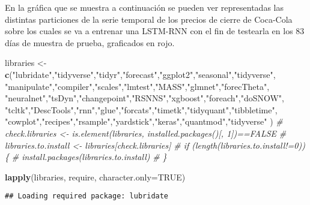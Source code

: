 \documentclass[]{article}
\newenvironment{Shaded}{\begin{snugshade}}{\end{snugshade}}
\newcommand{\CommentTok}[1]{\textcolor[rgb]{0.56,0.35,0.01}{\textit{#1}}}
\newcommand{\DataTypeTok}[1]{\textcolor[rgb]{0.13,0.29,0.53}{#1}}
\newcommand{\KeywordTok}[1]{\textcolor[rgb]{0.13,0.29,0.53}{\textbf{#1}}}
\newcommand{\NormalTok}[1]{#1}
\newcommand{\OtherTok}[1]{\textcolor[rgb]{0.56,0.35,0.01}{#1}}
\newcommand{\StringTok}[1]{\textcolor[rgb]{0.31,0.60,0.02}{#1}}
\begin{document}
\justifying

En la gráfica que se muestra a continuación se pueden ver representadas
las distintas particiones de la serie temporal de los precios de cierre
de Coca-Cola sobre los cuales se va a entrenar una LSTM-RNN con el fin
de testearla en los 83 días de muestra de prueba, graficados en rojo.

\centering

\begin{Shaded}
\begin{Highlighting}[]
\NormalTok{libraries <-}\StringTok{ }\KeywordTok{c}\NormalTok{(}\StringTok{"lubridate"}\NormalTok{,}\StringTok{"tidyverse"}\NormalTok{,}\StringTok{"tidyr"}\NormalTok{,}\StringTok{"forecast"}\NormalTok{,}\StringTok{"ggplot2"}\NormalTok{,}\StringTok{"seasonal"}\NormalTok{,}\StringTok{"tidyverse"}\NormalTok{,}
               \StringTok{"manipulate"}\NormalTok{,}\StringTok{"compiler"}\NormalTok{,}\StringTok{"scales"}\NormalTok{,}\StringTok{"lmtest"}\NormalTok{,}\StringTok{"MASS"}\NormalTok{,}\StringTok{"glmnet"}\NormalTok{,}\StringTok{"forecTheta"}\NormalTok{,}
               \StringTok{"neuralnet"}\NormalTok{,}\StringTok{"tsDyn"}\NormalTok{,}\StringTok{"changepoint"}\NormalTok{,}\StringTok{"RSNNS"}\NormalTok{,}\StringTok{"xgboost"}\NormalTok{,}\StringTok{"foreach"}\NormalTok{,}\StringTok{"doSNOW"}\NormalTok{,}
               \StringTok{"tcltk"}\NormalTok{,}\StringTok{"DescTools"}\NormalTok{,}\StringTok{"rnn"}\NormalTok{,}\StringTok{"glue"}\NormalTok{,}\StringTok{"forcats"}\NormalTok{,}\StringTok{"timetk"}\NormalTok{,}\StringTok{"tidyquant"}\NormalTok{,}\StringTok{"tibbletime"}\NormalTok{,}
               \StringTok{"cowplot"}\NormalTok{,}\StringTok{"recipes"}\NormalTok{,}\StringTok{"rsample"}\NormalTok{,}\StringTok{"yardstick"}\NormalTok{,}\StringTok{"keras"}\NormalTok{,}\StringTok{"quantmod"}\NormalTok{,}\StringTok{"tidyverse"}
\NormalTok{)}
\CommentTok{# check.libraries <- is.element(libraries, installed.packages()[, 1])==FALSE}
\CommentTok{# libraries.to.install <- libraries[check.libraries]}
\CommentTok{# if (length(libraries.to.install!=0)) \{}
\CommentTok{#   install.packages(libraries.to.install)}
\CommentTok{# \}}

\KeywordTok{lapply}\NormalTok{(libraries, require, }\DataTypeTok{character.only=}\OtherTok{TRUE}\NormalTok{)}
\end{Highlighting}
\end{Shaded}

\begin{verbatim}
## Loading required package: lubridate
\end{verbatim}
\end{document}

